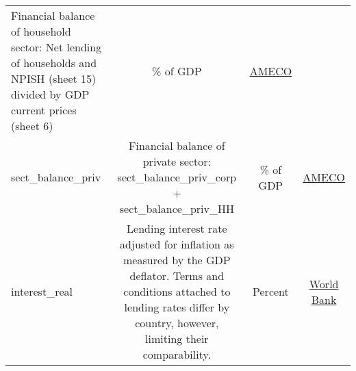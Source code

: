 \documentclass[]{article}
\begin{document}
\begin{longtable}[]{@{}lccc@{}}
\begin{minipage}[t]{0.36\columnwidth}
Financial balance of household sector: Net lending of households and
NPISH (sheet 15) divided by GDP current prices (sheet 6)\strut
\end{minipage} & \begin{minipage}[t]{0.24\columnwidth}\centering\strut
\% of GDP\strut
\end{minipage} & \begin{minipage}[t]{0.15\columnwidth}\centering\strut
\href{https://ec.europa.eu/info/business-economy-euro/indicators-statistics/economic-databases/macro-economic-database-ameco/download-annual-data-set-macro-economic-database-ameco_en}{AMECO}\strut
\end{minipage}\tabularnewline
\begin{minipage}[t]{0.14\columnwidth}\raggedright\strut
sect\_balance\_priv\strut
\end{minipage} & \begin{minipage}[t]{0.36\columnwidth}\centering\strut
Financial balance of private sector: sect\_balance\_priv\_corp +
sect\_balance\_priv\_HH\strut
\end{minipage} & \begin{minipage}[t]{0.24\columnwidth}\centering\strut
\% of GDP\strut
\end{minipage} & \begin{minipage}[t]{0.15\columnwidth}\centering\strut
\href{https://ec.europa.eu/info/business-economy-euro/indicators-statistics/economic-databases/macro-economic-database-ameco/download-annual-data-set-macro-economic-database-ameco_en}{AMECO}\strut
\end{minipage}\tabularnewline
\begin{minipage}[t]{0.14\columnwidth}\raggedright\strut
interest\_real\strut
\end{minipage} & \begin{minipage}[t]{0.36\columnwidth}\centering\strut
Lending interest rate adjusted for inflation as measured by the GDP
deflator. Terms and conditions attached to lending rates differ by
country, however, limiting their comparability.\strut
\end{minipage} & \begin{minipage}[t]{0.24\columnwidth}\centering\strut
Percent\strut
\end{minipage} & \begin{minipage}[t]{0.15\columnwidth}\centering\strut
\href{https://data.worldbank.org/indicator/FR.INR.RINR}{World
Bank}\strut
\end{minipage}\tabularnewline
\bottomrule
\end{longtable}
\end{document}
